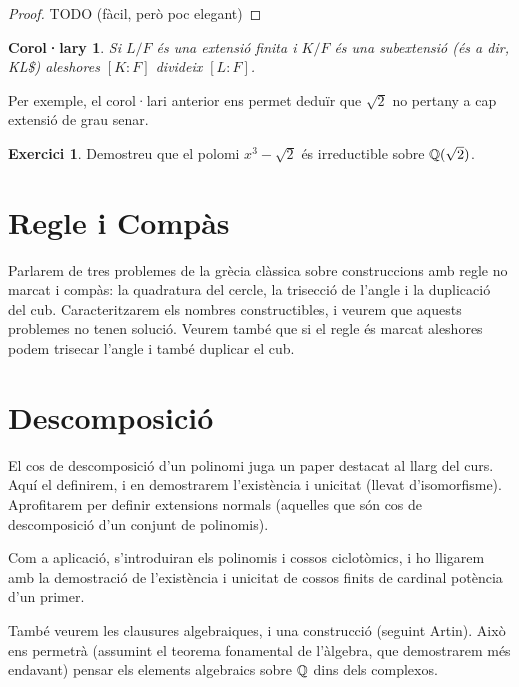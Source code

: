 \documentclass[
]{book}
\newtheorem{corollary}{Corol·lary}[chapter]
\theoremstyle{definition}
\theoremstyle{definition}
\theoremstyle{definition}
\newtheorem{exercise}{Exercici}[chapter]
\theoremstyle{definition}
\theoremstyle{remark}
\begin{document}
\begin{proof}
TODO (fàcil, però poc elegant)
\end{proof}

\begin{corollary}
Si \(L/F\) és una extensió finita i \(K/F\) és una subextensió (és a dir, K\subseteq L\$) aleshores \([K\colon F]\) divideix \([L\colon F]\).
\end{corollary}

Per exemple, el corol·lari anterior ens permet deduïr que \(\sqrt{2}\) no pertany a cap extensió de grau senar.

\begin{exercise}
Demostreu que el polomi \(x^3-\sqrt{2}\) és irreductible sobre \(\mathbb{Q}(\sqrt{2})\).
\end{exercise}

\hypertarget{regle-i-compuxe0s}{%
\chapter{Regle i Compàs}\label{regle-i-compuxe0s}}

Parlarem de tres problemes de la grècia clàssica sobre construccions amb regle no marcat i compàs: la quadratura del cercle,
la trisecció de l'angle i la duplicació del cub. Caracteritzarem els nombres constructibles, i veurem que aquests problemes
no tenen solució. Veurem també que si el regle és marcat aleshores podem trisecar l'angle i també duplicar el cub.

\hypertarget{descomposiciuxf3}{%
\chapter{Descomposició}\label{descomposiciuxf3}}

El cos de descomposició d'un polinomi juga un paper destacat al llarg del curs.
Aquí el definirem, i en demostrarem l'existència i unicitat (llevat d'isomorfisme).
Aprofitarem per definir extensions normals (aquelles que són cos de descomposició d'un conjunt de polinomis).

Com a aplicació, s'introduiran els polinomis i cossos ciclotòmics, i ho lligarem amb la
demostració de l'existència i unicitat de cossos finits de cardinal potència d'un primer.

També veurem les clausures algebraiques, i una construcció (seguint Artin). Això ens permetrà (assumint el teorema fonamental
de l'àlgebra, que demostrarem més endavant) pensar els elements algebraics sobre \(\mathbb{Q}\) dins dels complexos.
\end{document}
